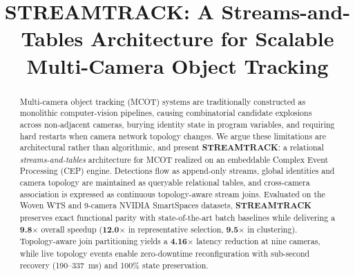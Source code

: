 \documentclass[conference]{IEEEtran}
\begin{document}
\title{STREAMTRACK: A Streams-and-Tables Architecture for Scalable Multi-Camera Object Tracking}

\author{
}


\maketitle

\begin{abstract}
Multi-camera object tracking (MCOT) systems are traditionally constructed as monolithic computer-vision pipelines, causing combinatorial candidate explosions across non-adjacent cameras, burying identity state in program variables, and requiring hard restarts when camera network topology changes. We argue these limitations are architectural rather than algorithmic, and present \textbf{STREAMTRACK}: a relational \emph{streams-and-tables} architecture for MCOT realized on an embeddable Complex Event Processing (CEP) engine. Detections flow as append-only streams, global identities and camera topology are maintained as queryable relational tables, and cross-camera association is expressed as continuous topology-aware stream joins. Evaluated on the Woven WTS and 9-camera NVIDIA SmartSpaces datasets, \textbf{STREAMTRACK} preserves exact functional parity with state-of-the-art batch baselines while delivering a \textbf{9.8$\times$} overall speedup (\textbf{12.0$\times$} in representative selection, \textbf{9.5$\times$} in clustering). Topology-aware join partitioning yields a \textbf{4.16$\times$} latency reduction at nine cameras, while live topology events enable zero-downtime reconfiguration with sub-second recovery (190--337~ms) and 100\% state preservation.
\end{abstract}
\end{document}
